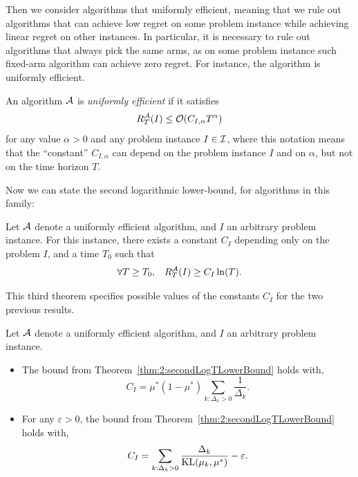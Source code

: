 Then we consider algorithms that uniformly efficient, meaning that we rule out algorithms that can achieve low regret on some problem instance while achieving linear regret on other instances.
In particular, it is necessary to rule out algorithms that always pick the same arms, as on some problem instance such fixed-arm algorithm can achieve zero regret.
For instance, the \UCB{} algorithm is uniformly efficient.

\begin{defn}\label{def:2:uniformlyEfficientAlgorithm}
    An algorithm $\mathcal{A}$ is \emph{uniformly efficient} if it satisfies
    \begin{equation}
        R_T^{\mathcal{A}}(I) \leq \mathop{}\mathopen{}\mathcal{O}\mathopen{}\left(C_{I,\alpha} T^{\alpha}\right)
    \end{equation}
    for any value $\alpha>0$ and any problem instance $I\in \mathcal{I}$,
    where this notation means that the ``constant'' $C_{I,\alpha}$ can depend on the problem instance $I$ and on $\alpha$, but not on the time horizon $T$.
\end{defn}

Now we can state the second logarithmic lower-bound, for algorithms in this family:

\begin{theorem}\label{thm:2:secondLogTLowerBound}
    Let $\mathcal{A}$ denote a uniformly efficient algorithm,
    and $I$ an arbitrary problem instance.
    For this instance,
    there exists a constant $C_I$ depending only on the problem $I$,
    and a time $T_0$ such that
    \begin{equation}
        \forall T \geq T_0, \;\;\; R_T^{\mathcal{A}}(I) \geq C_I \ln(T).
    \end{equation}
\end{theorem}

This third theorem specifies possible values of the constants $C_I$ for the two previous results.

\begin{theorem}\label{thm:2:forSecondLogTLowerBound}
    Let $\mathcal{A}$ denote a uniformly efficient algorithm,
    and $I$ an arbitrary problem instance.
    \begin{itemize}
        \item
        The bound from Theorem~\ref{thm:2:secondLogTLowerBound} holds with,
        \begin{equation}\label{eq:2:forSecondLogTLowerBound}
            C_I = \mu^* (1 - \mu^*) \sum_{k: \Delta_k > 0} \frac{1}{\Delta_k}.
        \end{equation}
        \item
        For any $\varepsilon>0$, the bound from Theorem~\ref{thm:2:secondLogTLowerBound} holds with,
        \begin{equation}\label{eq:2:forSecondLogTLowerBound2}
            C_I = \sum_{k: \Delta_k > 0} \frac{\Delta_k}{\mathrm{KL}(\mu_k, \mu^*)} - \varepsilon.
        \end{equation}
    \end{itemize}
\end{theorem}




